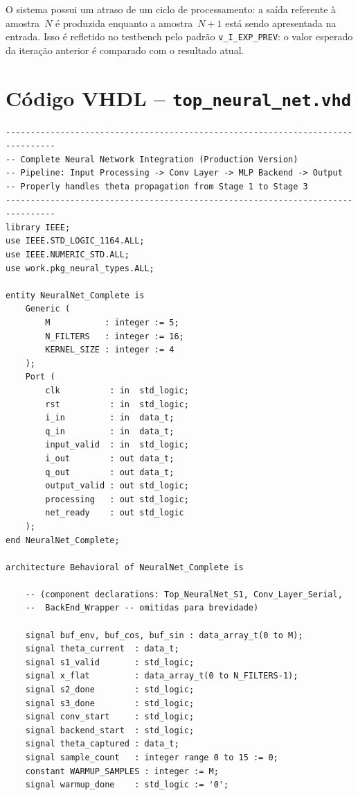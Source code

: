 \documentclass[a4paper,12pt]{article}
\begin{document}
O sistema possui um atraso de um ciclo de processamento: a sa\'ida referente \`a amostra~$N$ \'e produzida enquanto a amostra~$N+1$ est\'a sendo apresentada na entrada. Isso \'e refletido no testbench pelo padr\~ao \texttt{v\_I\_EXP\_PREV}: o valor esperado da itera\c{c}\~ao anterior \'e comparado com o resultado atual.


\section{C\'odigo VHDL -- \texttt{top\_neural\_net.vhd}}

\begin{lstlisting}[style=vhdlstyle,
    caption={C\'odigo VHDL completo do \texttt{NeuralNet\_Complete}.},
    label={lst:top}]
--------------------------------------------------------------------------------
-- Complete Neural Network Integration (Production Version)
-- Pipeline: Input Processing -> Conv Layer -> MLP Backend -> Output
-- Properly handles theta propagation from Stage 1 to Stage 3
--------------------------------------------------------------------------------
library IEEE;
use IEEE.STD_LOGIC_1164.ALL;
use IEEE.NUMERIC_STD.ALL;
use work.pkg_neural_types.ALL;

entity NeuralNet_Complete is
    Generic (
        M           : integer := 5;
        N_FILTERS   : integer := 16;
        KERNEL_SIZE : integer := 4
    );
    Port (
        clk          : in  std_logic;
        rst          : in  std_logic;
        i_in         : in  data_t;
        q_in         : in  data_t;
        input_valid  : in  std_logic;
        i_out        : out data_t;
        q_out        : out data_t;
        output_valid : out std_logic;
        processing   : out std_logic;
        net_ready    : out std_logic
    );
end NeuralNet_Complete;

architecture Behavioral of NeuralNet_Complete is

    -- (component declarations: Top_NeuralNet_S1, Conv_Layer_Serial,
    --  BackEnd_Wrapper -- omitidas para brevidade)

    signal buf_env, buf_cos, buf_sin : data_array_t(0 to M);
    signal theta_current  : data_t;
    signal s1_valid       : std_logic;
    signal x_flat         : data_array_t(0 to N_FILTERS-1);
    signal s2_done        : std_logic;
    signal s3_done        : std_logic;
    signal conv_start     : std_logic;
    signal backend_start  : std_logic;
    signal theta_captured : data_t;
    signal sample_count   : integer range 0 to 15 := 0;
    constant WARMUP_SAMPLES : integer := M;
    signal warmup_done    : std_logic := '0';


\end{lstlisting}
\end{document}
